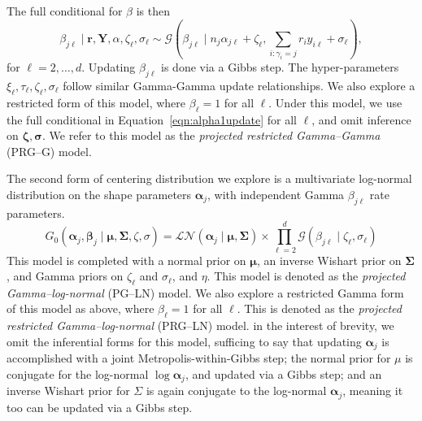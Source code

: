 The full conditional for $\beta$ is then
\begin{equation}
    \beta_{j\ell}\mid\bm{r},\bm{Y},\alpha,\zeta_{\ell},\sigma_{\ell} \sim \mathcal{G}\left(\beta_{j\ell}\mid n_j\alpha_{j\ell} + \zeta_\ell, \sum_{i:\gamma_i = j}r_iy_{i\ell} + \sigma_{\ell}\right),
\end{equation}
for $\ell = 2,\ldots, d$.  Updating $\beta_{j\ell}$ is done via a Gibbs step.  The hyper-parameters $\xi_{\ell},\tau_{\ell},\zeta_{\ell},\sigma_{\ell}$ follow similar Gamma-Gamma update relationships.  We also explore a restricted form of this model, where $\beta_{\ell} = 1$ for all $\ell$.  Under this model, we use the full conditional in Equation~\ref{eqn:alpha1update} for all $\ell$, and omit inference on $\bm{\zeta},\bm{\sigma}$.  We refer to this model as the \emph{projected restricted Gamma--Gamma} (PRG--G) model.

The second form of centering distribution we explore is a multivariate log-normal distribution on the shape parameters $\bm{\alpha}_j$, with independent Gamma $\beta_{j\ell}$ rate parameters.  
\begin{equation}
    G_0\left(\bm{\alpha}_j,\bm{\beta}_j\mid\bm{\mu},\bm{\Sigma},\zeta,\sigma\right) = \mathcal{LN}\left(\bm{\alpha}_j\mid\bm{\mu},\bm{\Sigma}\right)\times\prod_{\ell = 2}^d\mathcal{G}\left(\beta_{j\ell}\mid\zeta_{\ell},\sigma_{\ell}\right)
\end{equation}
This model is completed with a normal prior on $\bm{\mu}$, an inverse Wishart prior on $\bm{\Sigma}$, and Gamma priors on $\zeta_{\ell}$ and $\sigma_{\ell}$, and $\eta$.  This model is denoted as the \emph{projected Gamma--log-normal} (PG--LN) model.  We also explore a restricted Gamma form of this model as above, where $\beta_{\ell} = 1$ for all $\ell$.  This is denoted as the \emph{projected restricted Gamma--log-normal} (PRG--LN) model.  in the interest of brevity, we omit the inferential forms for this model, sufficing to say that updating $\bm{\alpha}_j$ is accomplished with a joint Metropolis-within-Gibbs step; the normal prior for $\mu$ is conjugate for the log-normal $\log\bm{\alpha}_j$, and updated via a Gibbs step; and an inverse Wishart prior for $\Sigma$ is again conjugate to the log-normal $\bm{\alpha}_j$, meaning it too can be updated via a Gibbs step.

